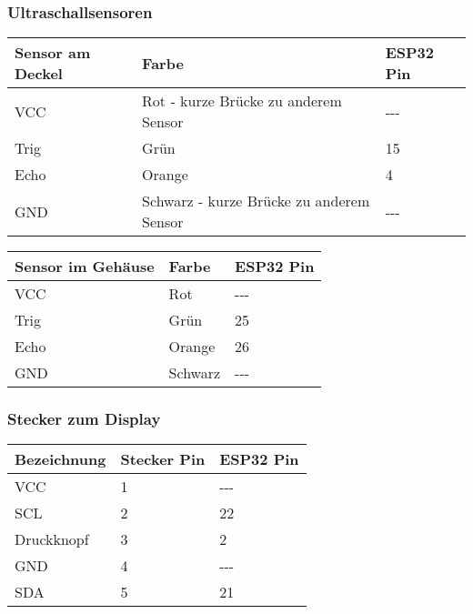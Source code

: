 \documentclass{scrartcl}
\begin{document}
\subsubsection{Ultraschallsensoren}

\begin{center}
	\begin{tabular}{@{}lll@{}}
		\toprule
		{Sensor am Deckel} & {Farbe} & {ESP32 Pin}\\
		\midrule
		{VCC} & {Rot - kurze Brücke zu anderem Sensor} &
		{-\/-\/-}\\
		{Trig} & {Grün} & {15}\\
		{Echo} & {Orange} & {4}\\
		{GND} & {Schwarz - kurze Brücke zu anderem Sensor} &
		{-\/-\/-}\\
		\bottomrule
	\end{tabular}
\end{center}

\begin{center}
	\begin{tabular}{@{}lll@{}}
		\toprule
		{Sensor im Gehäuse} & {Farbe} & {ESP32 Pin}\\
		\midrule
		{VCC} & {Rot} & {-\/-\/-}\\
		{Trig} & {Grün} & {25}\\
		{Echo} & {Orange} & {26}\\
		{GND} & {Schwarz} & {-\/-\/-}\\
		\bottomrule
	\end{tabular}
\end{center}

\subsubsection{Stecker zum Display}

\begin{center}
	\begin{tabular}{@{}lll@{}}
		\toprule
		{Bezeichnung} & {Stecker Pin} & {ESP32 Pin}\\
		\midrule
		{VCC} & {1} & {-\/-\/-}\\
		{SCL} & {2} & {22}\\
		{Druckknopf} & {3} & {2}\\
		{GND} & {4} & {-\/-\/-}\\
		{SDA} & {5} & {21}\\
		\bottomrule
	\end{tabular}
\end{center}
\end{document}
